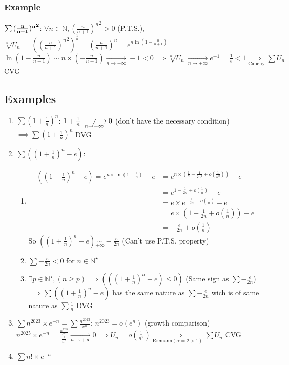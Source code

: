 \documentclass[notitlepage]{math}
\begin{document}
\subsubsection{Example}
$\bf \sum {(\frac{n}{n+1})^n}^2$: $\forall n \in \mathbb{N}, {(\frac{n}{n+1})^n}^2 > 0$ (P.T.S.), $\sqrt[n]{U_n} = \left({(\frac{n}{n+1})^n}^2\right)^{\frac{1}{n}} = (\frac{n}{n+1})^n = e^{n \ln(1 - \frac{n}{n+1})}$\\[0.2cm]
$\ln(1 - \frac{n}{n+1}) \sim n \times (-\frac{n}{n+1}) \xrightarrow[n \to +\infty]{} -1 < 0 \implies \sqrt[n]{U_n} \xrightarrow[n \to +\infty]{} e^{-1} = \frac{1}{e} < 1 \underset{\text{Cauchy}}{\implies} \sum U_n$ CVG\\
\subsection{Examples}
\begin{enumerate}[label=\protect\circled{\arabic*}]
    \item $\sum (1 + \frac{1}{n})^n$: $1 + \frac{1}{n} \centernot{\xrightarrow[n \to +\infty]{}} 0$ (don't have the necessary condition) $\implies \sum (1 + \frac{1}{n})^n$ DVG\\
    \item $\sum \left((1 + \frac{1}{n})^n - e\right)$: 
    \begin{enumerate}
        \item   \begin{align*}
             \left((1 + \frac{1}{n})^n - e\right) = e^{n \times \ln(1 + \frac{1}{n})} - e &= e^{n \times (\frac{1}{n} - \frac{1}{2n^2} + o(\frac{1}{n^2}))} - e \\
             &= e^{1 - \frac{1}{2n} + o(\frac{1}{n})} - e \\
             &= e \times e^{-\frac{1}{2n} + o(\frac{1}{n})} - e \\ &= e \times (1 - \frac{1}{2n} + o(\frac{1}{n})) - e \\ &= -\frac{e}{2n} + o(\frac{1}{n})
            \end{align*}
            So $\left((1 + \frac{1}{n})^n - e\right) \underset{+\infty}{\sim} -\frac{e}{2n}$ (Can't use P.T.S. property)
        \item $\sum -\frac{e}{2n} < 0$ for $ n \in \mathbb{N}^\star$
        \item $\exists p \in \mathbb{N}^\star, (n \geq p) \implies (\left((1 + \frac{1}{n})^n - e\right) \leq 0)$ (Same sign as $\sum -\frac{e}{2n}$) \\[0.2cm]
        $\implies \sum \left((1 + \frac{1}{n})^n - e\right)$ has the same nature as $\sum -\frac{e}{2n}$ wich is of same nature as $\sum \frac{1}{n}$ DVG
    \end{enumerate}
    \item $\sum n^{2023} \times e^{-n} = \sum \frac{n^{2023}}{e^n}$: $n^{2023} = o(e^n)$ (growth comparison)
    $n^{2025} \times e^{-n} = \frac{\frac{n^{2023}}{e^n}}{\frac{1}{n^2}} \xrightarrow[n \to +\infty]{} 0 \implies U_n = o(\frac{1}{n^2}) \underset{\text{Riemann} (\alpha = 2>1)}{\implies} \sum U_n$ CVG\\
    \item $\sum n! \times e^{-n}$\\
\end{enumerate}
\end{document}
